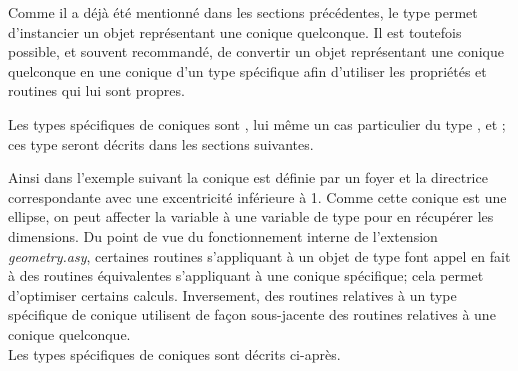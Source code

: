 \documentclass[pdftex]{article}
\newcommand{\geo}{l'extension \emph{geometry.asy}\xspace}
\begin{document}
Comme il a déjà été mentionné dans les sections précédentes, le type
 permet d'instancier un objet représentant une conique
quelconque. Il est toutefois possible, et souvent recommandé, de
convertir un objet représentant une conique quelconque en une conique
d'un type spécifique afin d'utiliser les propriétés et routines
qui lui sont propres.

Les types spécifiques de coniques sont , lui même un cas
particulier du type ,  et
; ces type seront décrits dans les sections suivantes.

Ainsi dans l'exemple suivant la conique  est définie par un
foyer et la directrice correspondante avec une excentricité inférieure à
1. Comme cette conique est une ellipse, on peut affecter la
variable  à une variable de type  pour en
récupérer les dimensions.
Du point de vue du fonctionnement interne de \geo, certaines routines
s'appliquant à un objet de type  font appel en fait à des
routines équivalentes s'appliquant à une conique spécifique; cela permet
d'optimiser certains calculs. Inversement, des routines relatives à un
type spécifique de conique utilisent de façon sous-jacente des
routines relatives à une conique quelconque.\\
Les types spécifiques de coniques sont décrits ci-après.

\end{document}
